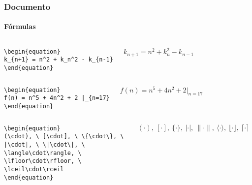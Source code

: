 \begin{frame}[fragile]
\frametitle{Documento}
\framesubtitle{Fórmulas}
  \scriptsize
  \begin{columns}[c]
  \begin{verbatim}
\begin{equation}
k_{n+1} = n^2 + k_n^2 - k_{n-1}
\end{equation}
  \end{verbatim}
  \begin{fmpage}{\textwidth}
\begin{equation}
k_{n+1} = n^2 + k_n^2 - k_{n-1}
\end{equation}
  \end{fmpage}
  \end{columns}


  \begin{columns}[c]
  \begin{verbatim}
\begin{equation}
f(n) = n^5 + 4n^2 + 2 |_{n=17}
\end{equation}
  \end{verbatim}
  \begin{fmpage}{\textwidth}
\begin{equation}
f(n) = n^5 + 4n^2 + 2 |_{n=17}
\end{equation}
  \end{fmpage}
  \end{columns}


  \begin{columns}[c]
  \begin{verbatim}
\begin{equation}
(\cdot), \ [\cdot], \ \{\cdot\}, \ 
|\cdot|, \ \|\cdot\|, \
\langle\cdot\rangle, \ 
\lfloor\cdot\rfloor, \ 
\lceil\cdot\rceil
\end{equation}
  \end{verbatim}
  \column{.5\textwidth}
  \begin{fmpage}{\textwidth}
\begin{equation}
(\cdot), \ [\cdot], \ \{\cdot\}, \ |\cdot|, \ \|\cdot\|, \
 \langle\cdot\rangle, \ \lfloor\cdot\rfloor, \ 
 \lceil\cdot\rceil
\end{equation}
  \end{fmpage}
  \end{columns}
\end{frame}



